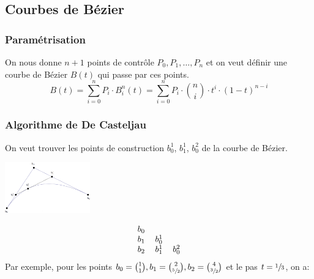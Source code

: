 \subsection*{Courbes de Bézier}
\noindent
\subsubsection*{Paramétrisation}
\noindent
On nous donne $n+1$ points de contrôle $P_0, P_1, \dots,
    P_n$ et on veut définir une courbe de Bézier $B(t)$ qui passe par ces points.
\begin{equation}
    B(t) = \sum_{i=0}^{n} P_i\cdot B_i^n(t)=\sum_{i=0}^{n} P_i\cdot \binom{n}{i}\cdot t^i\cdot (1-t)^{n-i}
    \nonumber
\end{equation}
\subsubsection*{Algorithme de De Casteljau}
\noindent
On veut trouver les points de construction $b_0^1$, $b_1^1$, $b_0^2$ de la courbe de Bézier.
\begin{center}
    \includegraphics[width=0.275\textwidth]{images/bezier.png}
\end{center}
\begin{equation}
    \begin{tabular}{ccc}
        $b_0$ &         &         \\
        $b_1$ & $b_0^1$ &         \\
        $b_2$ & $b_1^1$ & $b_0^2$ \\
    \end{tabular}
    \nonumber
\end{equation}
Par exemple, pour les points $b_0=\binom{1}{1}, b_1=\binom{2}{\sfrac{5}{2}}, b_2=\binom{4}{\sfrac{3}{2}}$ et le pas $t=\sfrac{1}{3}$, on a:
